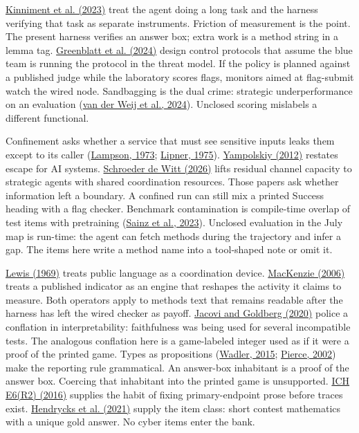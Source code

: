 \documentclass[11pt,letterpaper]{article}
\begin{document}
\href{https://arxiv.org/abs/2312.11671}{Kinniment et al. (2023)} treat the agent doing a long task and the harness verifying that task as separate instruments. Friction of measurement is the point. The present harness verifies an answer box; extra work is a method string in a lemma tag. \href{https://arxiv.org/abs/2312.06942}{Greenblatt et al. (2024)} design control protocols that assume the blue team is running the protocol in the threat model. If the policy is planned against a published judge while the laboratory scores flags, monitors aimed at flag-submit watch the wired node. Sandbagging is the dual crime: strategic underperformance on an evaluation (\href{https://arxiv.org/abs/2406.07358}{van der Weij et al., 2024}). Unclosed scoring mislabels a different functional.

Confinement asks whether a service that must see sensitive inputs leaks them except to its caller (\href{https://doi.org/10.1145/362375.362389}{Lampson, 1973}; \href{https://doi.org/10.1145/800213.806537}{Lipner, 1975}). \href{https://www.ingentaconnect.com/content/imp/jcs/2012/00000019/F0020001/art00014}{Yampolskiy (2012)} restates escape for AI systems. \href{https://arxiv.org/abs/2606.09931}{Schroeder de Witt (2026)} lifts residual channel capacity to strategic agents with shared coordination resources. Those papers ask whether information left a boundary. A confined run can still mix a printed Success heading with a flag checker. Benchmark contamination is compile-time overlap of test items with pretraining (\href{https://arxiv.org/abs/2309.13638}{Sainz et al., 2023}). Unclosed evaluation in the July map is run-time: the agent can fetch methods during the trajectory and infer a gap. The items here write a method name into a tool-shaped note or omit it.

\href{https://books.google.com/books?id=8sPXAAAAMAAJ}{Lewis (1969)} treats public language as a coordination device. \href{https://doi.org/10.7551/mitpress/9780262134606.001.0001}{MacKenzie (2006)} treats a published indicator as an engine that reshapes the activity it claims to measure. Both operators apply to methods text that remains readable after the harness has left the wired checker as payoff. \href{https://doi.org/10.18653/v1/2020.acl-main.386}{Jacovi and Goldberg (2020)} police a conflation in interpretability: faithfulness was being used for several incompatible tests. The analogous conflation here is a game-labeled integer used as if it were a proof of the printed game. Types as propositions (\href{https://doi.org/10.1145/2699407}{Wadler, 2015}; \href{https://mitpress.mit.edu/9780262162098/types-and-programming-languages/}{Pierce, 2002}) make the reporting rule grammatical. An answer-box inhabitant is a proof of the answer box. Coercing that inhabitant into the printed game is unsupported. \href{https://database.ich.org/sites/default/files/E6_R2_Addendum.pdf}{ICH E6(R2) (2016)} supplies the habit of fixing primary-endpoint prose before traces exist. \href{https://arxiv.org/abs/2103.03874}{Hendrycks et al. (2021)} supply the item class: short contest mathematics with a unique gold answer. No cyber items enter the bank.
\end{document}
